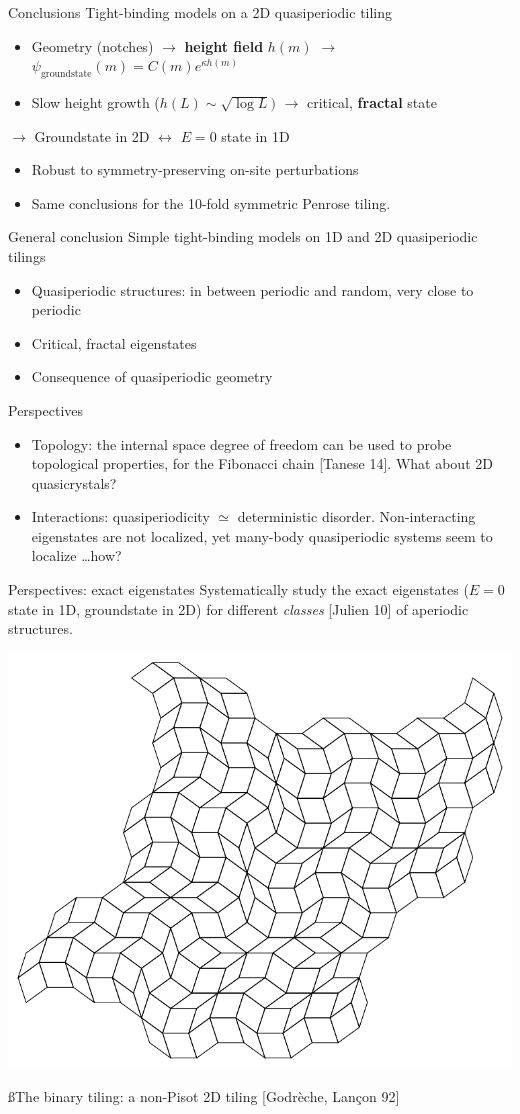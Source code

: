 \begin{frame}{Conclusions}
Tight-binding models on a 2D quasiperiodic tiling
\begin{itemize}
	\item Geometry (notches) $\to$ \textbf{height field} $h(m)$ $\to$ $\psi_\text{groundstate}(m) = C(m) e^{\kappa h(m)}$
	\item Slow height growth ($h(L) \sim \sqrt{\log L})$ $\to$ critical, \textbf{fractal} state
\end{itemize}
$\to$ Groundstate in 2D $\leftrightarrow$ $E=0$ state in 1D
\begin{itemize}
	\item Robust to symmetry-preserving on-site perturbations
	\item Same conclusions for the 10-fold symmetric Penrose tiling.
\end{itemize}
\end{frame}

\begin{frame}{General conclusion}
Simple tight-binding models on 1D and 2D quasiperiodic tilings
\begin{itemize}
	\item Quasiperiodic structures: in between periodic and random, very close to periodic
	\item Critical, fractal eigenstates
	\item Consequence of quasiperiodic geometry
\end{itemize}
Perspectives
\begin{itemize}
	\item Topology: the internal space degree of freedom can be used to probe topological properties, for the Fibonacci chain [Tanese \etal{} 14]. What about 2D quasicrystals?
	\item Interactions: quasiperiodicity $\simeq$ deterministic disorder. Non-interacting eigenstates are not localized, yet many-body quasiperiodic systems seem to localize \dots how?
\end{itemize}
\end{frame}

\begin{frame}{Perspectives: exact eigenstates}
Systematically study the exact eigenstates ($E=0$ state in 1D, groundstate in 2D) for different \emph{classes} [Julien 10] of aperiodic structures.

{\centering

\includegraphics[width=.45\textwidth]{img/4_part3/thick_4}

{\ss The binary tiling: a non-Pisot 2D tiling [Godrèche, Lançon 92]}

}

\end{frame}

